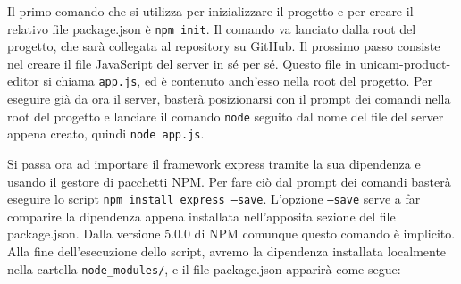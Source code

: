 Il primo comando che si utilizza per inizializzare il progetto e per creare il relativo file package.json è \texttt{npm init}. Il comando va lanciato dalla root del progetto, che sarà collegata al repository su GitHub.
Il prossimo passo consiste nel creare il file JavaScript del server in sé per sé. Questo file in unicam-product-editor si chiama \texttt{app.js}, ed è contenuto anch'esso nella root del progetto. Per eseguire già da ora il server, basterà posizionarsi con il prompt dei comandi nella root del progetto e lanciare il comando \texttt{node} seguito dal nome del file del server appena creato, quindi \texttt{node app.js}.

Si passa ora ad importare il framework express tramite la sua dipendenza e usando il gestore di pacchetti NPM. Per fare ciò dal prompt dei comandi basterà eseguire lo script \texttt{npm install express --save}. L'opzione \texttt{--save} serve a far comparire la dipendenza appena installata nell'apposita sezione del file package.json. Dalla versione 5.0.0 di NPM comunque questo comando è implicito.
Alla fine dell'esecuzione dello script, avremo la dipendenza installata localmente nella cartella \texttt{node\_modules/}, e il file package.json apparirà come segue:

